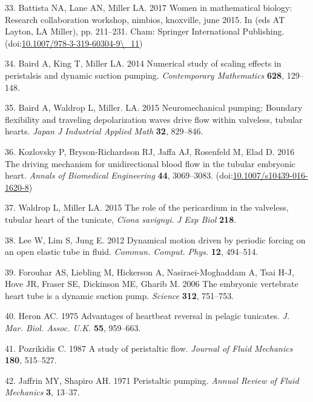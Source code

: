 \documentclass[
]{article}
\begin{document}
\leavevmode\hypertarget{ref-Battista:2017}{}%
33. Battista NA, Lane AN, Miller LA. 2017 Women in mathematical biology:
Research collaboration workshop, nimbios, knoxville, june 2015. In (eds
AT Layton, LA Miller), pp. 211--231. Cham: Springer International
Publishing.
(doi:\href{https://doi.org/10.1007/978-3-319-60304-9/_11}{10.1007/978-3-319-60304-9\textbackslash\_11})

\leavevmode\hypertarget{ref-Baird:2014}{}%
34. Baird A, King T, Miller LA. 2014 Numerical study of scaling effects
in peristalsis and dynamic suction pumping. \emph{Contemporary
Mathematics} \textbf{628}, 129--148.

\leavevmode\hypertarget{ref-Baird:2015}{}%
35. Baird A, Waldrop L, Miller. LA. 2015 Neuromechanical pumping:
Boundary flexibility and traveling depolarization waves drive flow
within valveless, tubular hearts. \emph{Japan J Industrial Applied Math}
\textbf{32}, 829--846.

\leavevmode\hypertarget{ref-Kozlovsky:2016}{}%
36. Kozlovsky P, Bryson-Richardson RJ, Jaffa AJ, Rosenfeld M, Elad D.
2016 The driving mechanism for unidirectional blood flow in the tubular
embryonic heart. \emph{Annals of Biomedical Engineering} \textbf{44},
3069--3083.
(doi:\href{https://doi.org/10.1007/s10439-016-1620-8}{10.1007/s10439-016-1620-8})

\leavevmode\hypertarget{ref-Waldrop:pericardium}{}%
37. Waldrop L, Miller LA. 2015 The role of the pericardium in the
valveless, tubular heart of the tunicate, \emph{Ciona savignyi}. \emph{J
Exp Biol} \textbf{218}.

\leavevmode\hypertarget{ref-Lee:2012}{}%
38. Lee W, Lim S, Jung E. 2012 Dynamical motion driven by periodic
forcing on an open elastic tube in fluid. \emph{Commun. Comput. Phys.}
\textbf{12}, 494--514.

\leavevmode\hypertarget{ref-Forouhar:2006}{}%
39. Forouhar AS, Liebling M, Hickerson A, Nasiraei-Moghaddam A, Tsai
H-J, Hove JR, Fraser SE, Dickinson ME, Gharib M. 2006 The embryonic
vertebrate heart tube is a dynamic suction pump. \emph{Science}
\textbf{312}, 751--753.

\leavevmode\hypertarget{ref-Heron:1975}{}%
40. Heron AC. 1975 Advantages of heartbeat reversal in pelagic
tunicates. \emph{J. Mar. Biol. Assoc. U.K.} \textbf{55}, 959--663.

\leavevmode\hypertarget{ref-Pozrikidis:87}{}%
41. Pozrikidis C. 1987 A study of peristaltic flow. \emph{Journal of
Fluid Mechanics} \textbf{180}, 515--527.

\leavevmode\hypertarget{ref-Jaffrin:71}{}%
42. Jaffrin MY, Shapiro AH. 1971 Peristaltic pumping. \emph{Annual
Review of Fluid Mechanics} \textbf{3}, 13--37.
\end{document}
